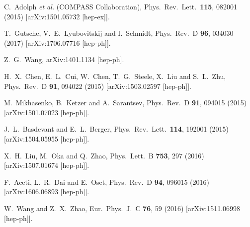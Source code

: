 \documentclass[aps,prd,floatfix,superscriptaddress,showpacs,showkeys]{revtex4}
\begin{document}
\begin{thebibliography}{99}

  C.~Adolph {\it et al.} (COMPASS Collaboration),
  Phys.\ Rev.\ Lett.\  {\bf 115}, 082001 (2015)
  [arXiv:1501.05732 [hep-ex]].

  T.~Gutsche, V.~E.~Lyubovitskij and I.~Schmidt,
  Phys.\ Rev.\ D {\bf 96}, 034030 (2017)
  [arXiv:1706.07716 [hep-ph]].
                                                                                  
  Z.~G.~Wang,
  arXiv:1401.1134 [hep-ph].

  H.~X.~Chen, E.~L.~Cui, W.~Chen, T.~G.~Steele, X.~Liu and S.~L.~Zhu,
  Phys.\ Rev.\ D {\bf 91}, 094022 (2015)
  [arXiv:1503.02597 [hep-ph]].

  M.~Mikhasenko, B.~Ketzer and A.~Sarantsev,
  Phys.\ Rev.\ D {\bf 91}, 094015 (2015)
  [arXiv:1501.07023 [hep-ph]].

  J.~L.~Basdevant and E.~L.~Berger,
  Phys.\ Rev.\ Lett.\  {\bf 114}, 192001 (2015)
  [arXiv:1504.05955 [hep-ph]].

  X.~H.~Liu, M.~Oka and Q.~Zhao,
  Phys.\ Lett.\ B {\bf 753}, 297 (2016)
  [arXiv:1507.01674 [hep-ph]].

  F.~Aceti, L.~R.~Dai and E.~Oset,
  Phys.\ Rev.\ D {\bf 94}, 096015 (2016)
  [arXiv:1606.06893 [hep-ph]].

  W.~Wang and Z.~X.~Zhao,
  Eur.\ Phys.\ J.\ C {\bf 76}, 59 (2016)
  [arXiv:1511.06998 [hep-ph]].


\end{thebibliography}
\end{document}
